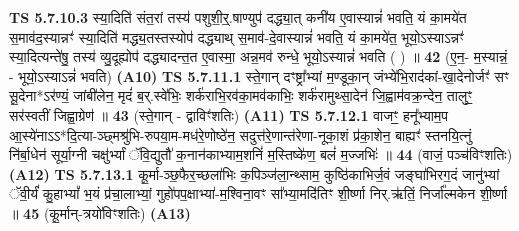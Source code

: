 \documentclass[17pt]{extarticle}
\begin{document}
                                \textbf{ TS 5.7.10.3} \newline
                  स्या॒दिति॑ संत॒रां तस्य॑ पशुशी॒र्॒.षाण्युप॑ दद्ध्या॒त् कनी॑य ए॒वास्यान्नं॑ भवति॒ यं का॒मये॑त स॒माव॑द॒स्यान्नꣳ॑ स्या॒दिति॑ मद्ध्य॒तस्तस्योप॑ दद्ध्याथ् स॒माव॑-दे॒वास्यान्नं॑ भवति॒ यं का॒मये॑त॒ भूयो॒ऽस्याऽन्नꣳ॑ स्या॒दित्यन्ते॑षु॒ तस्य॑ व्यु॒दूह्योप॑ दद्ध्यादन्त॒त ए॒वास्मा॒ अन्न॒मव॑ रुन्धे॒ भूयो॒ऽस्यान्नं॑ भवति ( ) ॥ \textbf{  42 } \newline
                  \newline
                      (ए॒न॒- म॒स्यान्नं॒ - भूयो॒ऽस्याऽन्नं॑ भवति)  \textbf{(A10)} \newline \newline
                                        \textbf{ TS 5.7.11.1} \newline
                  स्ते॒गान् दꣳष्ट्रा᳚भ्यां म॒ण्डूका॒न् जंभ्ये॑भि॒राद॑कां-खा॒देनोर्जꣳ॑ सꣳ सू॒देना*ऽर॑ण्यं॒ जांबी॑लेन॒ मृदं॑ ब॒र्.स्वे॑भिः॒ शर्क॑राभि॒रव॑का॒मव॑काभिः॒ शर्क॑रामुथ्सा॒देन॑ जि॒ह्वाम॑वक्र॒न्देन॒ तालुꣳ॒॒ सर॑स्वतीं जिह्वा॒ग्रेण॑ ॥ \textbf{  43 } \newline
                  \newline
                      (स्ते॒गान् - द्वाविꣳ॑शतिः)  \textbf{(A11)} \newline \newline
                                        \textbf{ TS 5.7.12.1} \newline
                  वाजꣳ॒॒ हनू᳚भ्याम॒प आ॒स्ये॑नाऽऽ*दि॒त्या-ञ्छ्मश्रु॑भि-रुपया॒म-मध॑रे॒णोष्ठे॑न॒ सदुत्त॑रे॒णान्त॑रेणा-नूका॒शं प्र॑का॒शेन॒ बाह्यꣳ॑ स्तनयि॒त्नुं नि॑र्बा॒धेन॑ सूर्या॒ग्नी चक्षु॑र्भ्यां ॅवि॒द्युतौ॑ क॒नान॑काभ्याम॒शनिं॑ म॒स्तिष्के॑ण॒ बलं॑ म॒ज्जभिः॑ ॥ \textbf{  44 } \newline
                  \newline
                      (वाजं॒ पञ्च॑विꣳशतिः)  \textbf{(A12)} \newline \newline
                                        \textbf{ TS 5.7.13.1} \newline
                  कू॒र्मा-ञ्छ॒फैर॒च्छला॑भिः क॒पिञ्ज॑ला॒न्थ्साम॒ कुष्ठि॑काभिर्ज॒वं जङ्घा॑भिरग॒दं जानु॑भ्यां ॅवी॒र्यं॑ कु॒हाभ्यां᳚ भ॒यं प्र॑चा॒लाभ्यां॒ गुहो॑पप॒क्षाभ्या॑-म॒श्विना॒वꣳ सा᳚भ्या॒मदि॑तिꣳ शी॒र्ष्णा निर्.ऋ॑तिं॒ निर्जा᳚ल्मकेन शी॒र्ष्णा ॥ \textbf{  45 } \newline
                  \newline
                      (कू॒र्मान्-त्रयो॑विꣳशतिः)  \textbf{(A13)} \newline \newline
\end{document}
